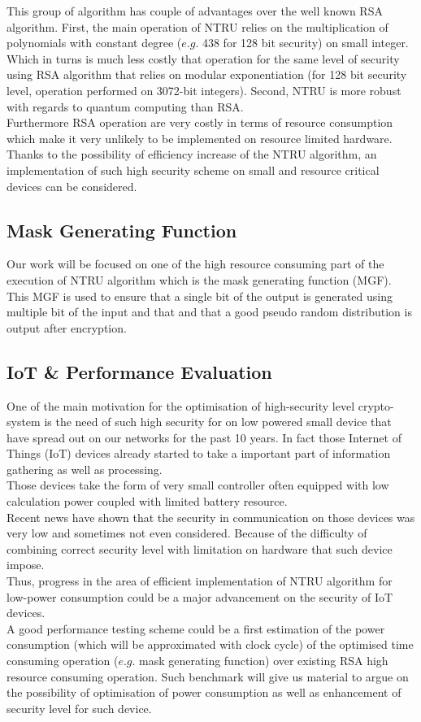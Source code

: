 This group of algorithm has couple of advantages over the well known RSA algorithm. First, the main operation of NTRU relies on the multiplication of polynomials with constant degree ($e.g.$ 438 for 128 bit security) on small integer. Which in turns is much less costly that operation for the same level of security using RSA algorithm that relies on modular exponentiation (for 128 bit security level, operation performed on 3072-bit integers). Second, NTRU is more robust with regards to quantum computing than RSA.\\
Furthermore RSA operation are very costly in terms of resource consumption which make it very unlikely to be implemented on resource limited hardware. Thanks to the possibility of efficiency increase of the NTRU algorithm, an implementation of such high security scheme on small and resource critical devices can be considered.
\subsection{Mask Generating Function}
Our work will be focused on one of the high resource consuming part of the execution of NTRU algorithm which is the mask generating function (MGF). This MGF is used to ensure that a single bit of the output is generated using multiple bit of the input and that and that a good pseudo random distribution is output after encryption.\\

\subsection{IoT \& Performance Evaluation}
One of the main motivation for the optimisation of high-security level crypto-system is the need of such high security for on low powered small device that have spread out on our networks for the past 10 years. In fact those Internet of Things (IoT) devices already started to take a important part of information gathering as well as processing.\\
Those devices take the form of very small controller often equipped with low calculation power coupled with limited battery resource.\\
Recent news have shown that the security in communication on those devices was very low and sometimes not even considered. Because of the difficulty of combining correct security level with limitation on hardware that such device impose.\\
Thus, progress in the area of efficient implementation of NTRU algorithm for low-power consumption could be a major advancement on the security of IoT devices.
\\A good performance testing scheme could be a first estimation of the power consumption (which will be approximated with clock cycle) of the optimised time consuming operation ($e.g.$ mask generating function) over existing RSA high resource consuming operation. Such benchmark will give us material to argue on the possibility of optimisation of power consumption as well as  enhancement of security level for such device.

